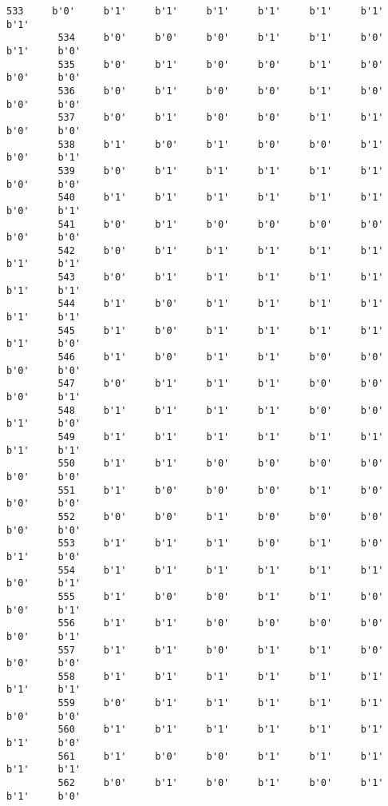 \documentclass[11pt]{article}
\begin{document}
\begin{Verbatim}[commandchars=\\\{\}]
         533     b'0'     b'1'     b'1'     b'1'     b'1'     b'1'     b'1'     b'1'   
         534     b'0'     b'0'     b'0'     b'1'     b'1'     b'0'     b'1'     b'0'   
         535     b'0'     b'1'     b'0'     b'0'     b'1'     b'0'     b'0'     b'0'   
         536     b'0'     b'1'     b'0'     b'0'     b'1'     b'0'     b'0'     b'0'   
         537     b'0'     b'1'     b'0'     b'0'     b'1'     b'1'     b'0'     b'0'   
         538     b'1'     b'0'     b'1'     b'0'     b'0'     b'1'     b'0'     b'1'   
         539     b'0'     b'1'     b'1'     b'1'     b'1'     b'1'     b'0'     b'0'   
         540     b'1'     b'1'     b'1'     b'1'     b'1'     b'1'     b'0'     b'1'   
         541     b'0'     b'1'     b'0'     b'0'     b'0'     b'0'     b'0'     b'0'   
         542     b'0'     b'1'     b'1'     b'1'     b'1'     b'1'     b'1'     b'1'   
         543     b'0'     b'1'     b'1'     b'1'     b'1'     b'1'     b'1'     b'1'   
         544     b'1'     b'0'     b'1'     b'1'     b'1'     b'1'     b'1'     b'1'   
         545     b'1'     b'0'     b'1'     b'1'     b'1'     b'1'     b'1'     b'0'   
         546     b'1'     b'0'     b'1'     b'1'     b'0'     b'0'     b'0'     b'0'   
         547     b'0'     b'1'     b'1'     b'1'     b'0'     b'0'     b'0'     b'1'   
         548     b'1'     b'1'     b'1'     b'1'     b'0'     b'0'     b'1'     b'0'   
         549     b'1'     b'1'     b'1'     b'1'     b'1'     b'1'     b'1'     b'1'   
         550     b'1'     b'1'     b'0'     b'0'     b'0'     b'0'     b'0'     b'0'   
         551     b'1'     b'0'     b'0'     b'0'     b'1'     b'0'     b'0'     b'0'   
         552     b'0'     b'0'     b'1'     b'0'     b'0'     b'0'     b'0'     b'0'   
         553     b'1'     b'1'     b'1'     b'0'     b'1'     b'0'     b'1'     b'0'   
         554     b'1'     b'1'     b'1'     b'1'     b'1'     b'1'     b'0'     b'1'   
         555     b'1'     b'0'     b'0'     b'1'     b'1'     b'0'     b'0'     b'1'   
         556     b'1'     b'1'     b'0'     b'0'     b'0'     b'0'     b'0'     b'1'   
         557     b'1'     b'1'     b'0'     b'1'     b'1'     b'0'     b'0'     b'0'   
         558     b'1'     b'1'     b'1'     b'1'     b'1'     b'1'     b'1'     b'1'   
         559     b'0'     b'1'     b'1'     b'1'     b'1'     b'1'     b'0'     b'0'   
         560     b'1'     b'1'     b'1'     b'1'     b'1'     b'1'     b'1'     b'0'   
         561     b'1'     b'0'     b'0'     b'1'     b'1'     b'1'     b'1'     b'1'   
         562     b'0'     b'1'     b'0'     b'1'     b'0'     b'1'     b'1'     b'0'   

\end{Verbatim}
\end{document}
